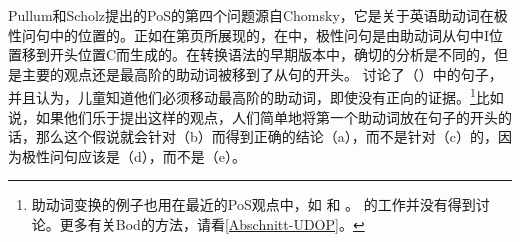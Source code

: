 Pullum和Scholz提出的PoS的第四个问题源自Chomsky，它是关于英语助动词在极性问句中的位置的。正如在第\pageref{Seite-GB-Entscheidungsfragen-Englisch}页所展现的，在\gbtc 中，极性问句是由助动词从句中I位置移到开头位置C而生成的。在转换语法的早期版本中，确切的分析是不同的，但是主要的观点还是最高阶的助动词被移到了从句的开头。
  \citet[--33]{Chomsky71a-u}讨论了（）中的句子，并且认为，儿童知道他们必须移动最高阶的助动词，即使没有正向的证据。\footnote{%
 助动词变换的例子也用在最近的PoS观点中，如 和 。 \citet{Bod2009a}的工作并没有得到讨论。更多有关Bod的方法，请看\ref{Abschnitt-UDOP}。
 }比如说，如果他们乐于提出这样的观点，人们简单地将第一个助动词放在句子的开头的话，那么这个假说就会针对（b）而得到正确的结论（a），而不是针对（c）的，因为极性问句应该是（d），而不是（e）。
\eal
{}
